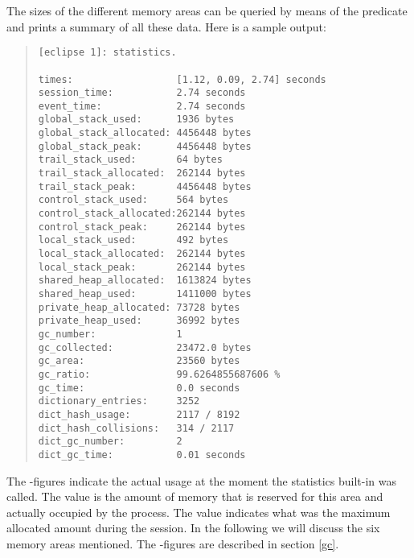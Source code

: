 The sizes of the different memory areas can be queried by means of the predicate
 and
 prints a summary of
all these data.
Here is a sample output:
\begin{quote}
\begin{verbatim}
[eclipse 1]: statistics.

times:                  [1.12, 0.09, 2.74] seconds
session_time:           2.74 seconds
event_time:             2.74 seconds
global_stack_used:      1936 bytes
global_stack_allocated: 4456448 bytes
global_stack_peak:      4456448 bytes
trail_stack_used:       64 bytes
trail_stack_allocated:  262144 bytes
trail_stack_peak:       4456448 bytes
control_stack_used:     564 bytes
control_stack_allocated:262144 bytes
control_stack_peak:     262144 bytes
local_stack_used:       492 bytes
local_stack_allocated:  262144 bytes
local_stack_peak:       262144 bytes
shared_heap_allocated:  1613824 bytes
shared_heap_used:       1411000 bytes
private_heap_allocated: 73728 bytes
private_heap_used:      36992 bytes
gc_number:              1
gc_collected:           23472.0 bytes
gc_area:                23560 bytes
gc_ratio:               99.6264855687606 %
gc_time:                0.0 seconds
dictionary_entries:     3252
dict_hash_usage:        2117 / 8192
dict_hash_collisions:   314 / 2117
dict_gc_number:         2
dict_gc_time:           0.01 seconds
\end{verbatim}
\end{quote}
The -figures indicate the actual usage at the moment the
statistics built-in was called. The  value is the
amount of memory that is reserved for this area and actually occupied
by the {\eclipse} process. The  value indicates what was the
maximum allocated amount during the session.
In the following we will discuss the six memory areas mentioned.
The -figures are described in section \ref{gc}.

